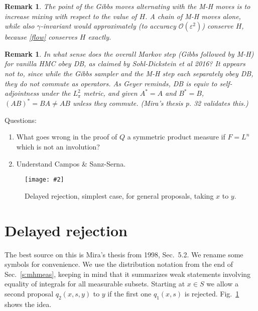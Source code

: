 \documentclass[10pt]{article}
\newcommand{\ben}{\begin{enumerate}}
\newcommand{\een}{\end{enumerate}}
\newcommand{\bfi}{\begin{figure}}
\newcommand{\efi}{\end{figure}}
\newcommand{\ca}[2]{\caption{#1 \label{#2}}}
\newcommand{\ig}[2]{\texttt{[image: \#2]}}
\newcommand{\bigO}{{\mathcal O}}
\newtheorem{rmk}[thm]{Remark}
\newcommand{\eps}{\varepsilon}
\begin{document}
\begin{rmk}
  The point of the Gibbs moves alternating with the M-H moves
  is to increase mixing with respect to
  the value of $H$. A chain of M-H moves alone, while
  also $\gamma$-invariant would approximately
  (to accuracy $\bigO(\eps^2)$) conserve $H$, because \eqref{flow} conserves
  $H$ exactly.
\end{rmk}

\begin{rmk}
  In what sense does the overall Markov step (Gibbs followed by M-H) for vanilla HMC obey DB, as claimed by Sohl-Dickstein et al 2016?
  It appears not to, since while the Gibbs sampler and the M-H step
  each separately obey DB, they do not commute as operators.
  As Geyer reminds, DB is equiv to self-adjointness under the $L^2_\pi$ metric,
  and given $A^\ast=A$ and $B^\ast=B$,
  $(AB)^\ast = BA \neq AB$ unless they commute. (Mira's thesis p. 32 validates
  this.)
\end{rmk}

Questions:
\ben
\item What goes wrong in the proof of $Q$ a symmetric product measure
  if $F=L^n$ which is not an involution?
\item Understand Campos \& Sanz-Serna.
\een
  


\bfi  %
\centering\ig{width=5in}{Mira.eps}
\ca{Delayed rejection, simplest case, for general proposals, taking
$x$ to $y$.}{f:mira}
\efi


\section{Delayed rejection}

The best source on this is Mira's thesis from 1998, Sec.~5.2.
We rename some symbols for convenience.
We use the distribution notation from the end of
Sec.~\ref{s:mhmeas}, keeping in mind that it summarizes
weak statements involving equality of integrals for all measurable subsets.
Starting at $x\in S$ we allow a second proposal $q_2(x,s,y)$ to $y$ if
the first one $q_1(x,s)$ is rejected.
Fig.~\ref{f:mira} shows the idea.











\end{document}

